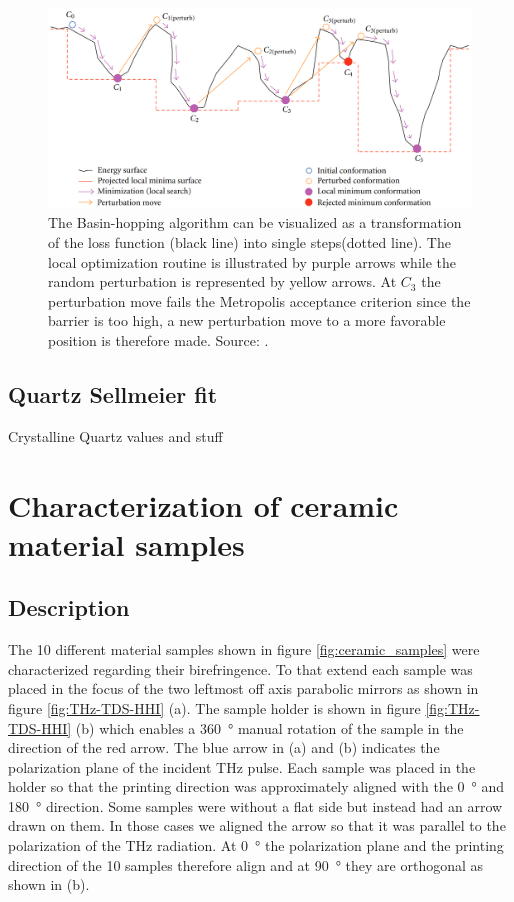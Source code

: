 \begin{figure}[h]
    \centering
    \includegraphics[scale=0.3]{images/7_appendix/bh.png}
    \caption{The Basin-hopping algorithm can be visualized as a transformation of the loss function (black line) into single steps(dotted line). 
    The local optimization routine is illustrated by purple arrows while the random perturbation is represented by yellow arrows. At $C_3$ the perturbation move fails the Metropolis acceptance criterion since the barrier is too high, a new perturbation move to a more favorable position is therefore made. Source: \cite{Olson2012}.}
    \label{fig:Basin-hopping}
\end{figure}

\section{Quartz Sellmeier fit}
\label{sec:sellmeier}
Crystalline Quartz values and stuff

\newpage

\chapter{Characterization of ceramic material samples}
\label{sec:ceramic_characterization}
\section{Description}
The 10 different material samples shown in figure \ref{fig:ceramic_samples} were characterized regarding their birefringence. To that extend each sample was placed in the focus of the two leftmost off axis parabolic mirrors as shown in figure \ref{fig:THz-TDS-HHI} (a). The sample holder is shown in figure \ref{fig:THz-TDS-HHI} (b) which enables a \SI{360}{\degree} manual rotation of the sample in the direction of the red arrow. The blue arrow in (a) and (b) indicates the polarization plane of the incident THz pulse. Each sample was placed in the holder so that the printing direction was approximately aligned with the \SI{0}{\degree} and \SI{180}{\degree} direction. Some samples were without a flat side but instead had an arrow drawn on them. In those cases we aligned the arrow so that it was parallel to the polarization of the THz radiation. At \SI{0}{\degree} the polarization plane and the printing direction of the 10 samples therefore align and at \SI{90}{\degree} they are orthogonal as shown in (b). 

